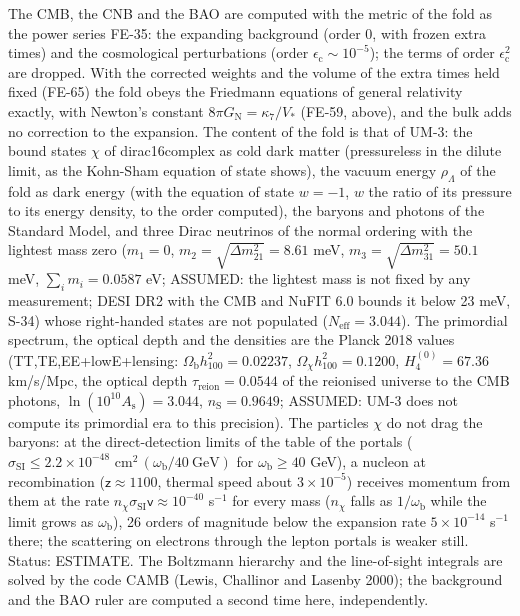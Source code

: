 \documentclass[
  10pt,
]{article}
\begin{document}
The CMB, the CNB and the BAO are computed with the metric of the fold as
the power series FE-35: the expanding background (order 0, with frozen
extra times) and the cosmological perturbations (order
\(\epsilon_{\mathrm{c}} \sim 10^{-5}\)); the terms of order
\(\epsilon_{\mathrm{c}}^2\) are dropped. With the corrected weights and
the volume of the extra times held fixed (FE-65) the fold obeys the
Friedmann equations of general relativity exactly, with Newton's
constant \(8\pi G_{\mathrm{N}} = \kappa_7/V_*\) (FE-59, above), and the
bulk adds no correction to the expansion. The content of the fold is
that of UM-3: the bound states \(\chi\) of dirac16complex as cold dark
matter (pressureless in the dilute limit, as the Kohn-Sham equation of
state shows), the vacuum energy \(\rho_\Lambda\) of the fold as dark
energy (with the equation of state \(w = -1\), \(w\) the ratio of its
pressure to its energy density, to the order computed), the baryons and
photons of the Standard Model, and three Dirac neutrinos of the normal
ordering with the lightest mass zero (\(m_1 = 0\),
\(m_2 = \sqrt{\Delta m^2_{21}} = 8.61\) meV,
\(m_3 = \sqrt{\Delta m^2_{31}} = 50.1\) meV, \(\sum_im_i = 0.0587\) eV;
ASSUMED: the lightest mass is not fixed by any measurement; DESI DR2
with the CMB and NuFIT 6.0 bounds it below 23 meV, S-34) whose
right-handed states are not populated (\(N_{\mathrm{eff}} = 3.044\)).
The primordial spectrum, the optical depth and the densities are the
Planck 2018 values (TT,TE,EE+lowE+lensing:
\(\Omega_{\mathrm{b}}h_{100}^2 = 0.02237\),
\(\Omega_\chi h_{100}^2 = 0.1200\), \(H_4^{(0)} = 67.36\) km/s/Mpc, the
optical depth \(\tau_{\mathrm{reion}} = 0.0544\) of the reionised
universe to the CMB photons, \(\ln(10^{10}A_{\mathrm{s}}) = 3.044\),
\(n_{\mathrm{S}} = 0.9649\); ASSUMED: UM-3 does not compute its
primordial era to this precision). The particles \(\chi\) do not drag
the baryons: at the direct-detection limits of the table of the portals
(\(\sigma_{\mathrm{SI}} \le 2.2\times10^{-48}\)
cm\(^2\,(\omega_{\mathrm{b}}/40\ \text{GeV})\) for
\(\omega_{\mathrm{b}} \ge 40\) GeV), a nucleon at recombination
(\(\mathsf{z} \approx 1100\), thermal speed about \(3\times10^{-5}\))
receives momentum from them at the rate
\(n_\chi\sigma_{\mathrm{SI}}\mathsf{v} \approx 10^{-40}\) s\(^{-1}\) for
every mass (\(n_\chi\) falls as \(1/\omega_{\mathrm{b}}\) while the
limit grows as \(\omega_{\mathrm{b}}\)), 26 orders of magnitude below
the expansion rate \(5\times10^{-14}\) s\(^{-1}\) there; the scattering
on electrons through the lepton portals is weaker still. Status:
ESTIMATE. The Boltzmann hierarchy and the line-of-sight integrals are
solved by the code CAMB (Lewis, Challinor and Lasenby 2000); the
background and the BAO ruler are computed a second time here,
independently.
\end{document}
